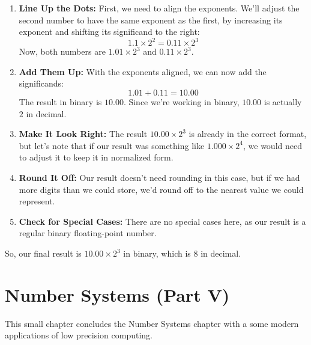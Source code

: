 \documentclass[12pt,openany]{book}
\begin{document}
			      	\begin{enumerate}
			      		\item \textbf{Line Up the Dots:} First, we need to align the exponents. We'll adjust the second number to have the same exponent as the first, by increasing its exponent and shifting its significand to the right: 
			      		      \[
			      		      	1.1 \times 2^2 = 0.11 \times 2^3
			      		      \]
			      		      Now, both numbers are $1.01 \times 2^3$ and $0.11 \times 2^3$.
			      		      
			      		\item \textbf{Add Them Up:} With the exponents aligned, we can now add the significands:
			      		      \[
			      		      	1.01 + 0.11 = 10.00
			      		      \]
			      		      The result in binary is $10.00$. Since we're working in binary, $10.00$ is actually $2$ in decimal. 
			      		      
			      		\item \textbf{Make It Look Right:} The result $10.00 \times 2^3$ is already in the correct format, but let's note that if our result was something like $1.000 \times 2^4$, we would need to adjust it to keep it in normalized form.
			      		      
			      		\item \textbf{Round It Off:} Our result doesn't need rounding in this case, but if we had more digits than we could store, we'd round off to the nearest value we could represent.
			      		      
			      		\item \textbf{Check for Special Cases:} There are no special cases here, as our result is a regular binary floating-point number.
			      	\end{enumerate}
			      	
			      	So, our final result is $10.00 \times 2^3$ in binary, which is $8$ in decimal.
			      	
			      	
			      	\chapter{Number Systems (Part V)}
			      	
			      	
			      	
			      	
			      	\begin{text}
			      		This small chapter concludes the Number Systems chapter with a some modern applications of low precision computing.
			      	\end{text}
\end{document}
